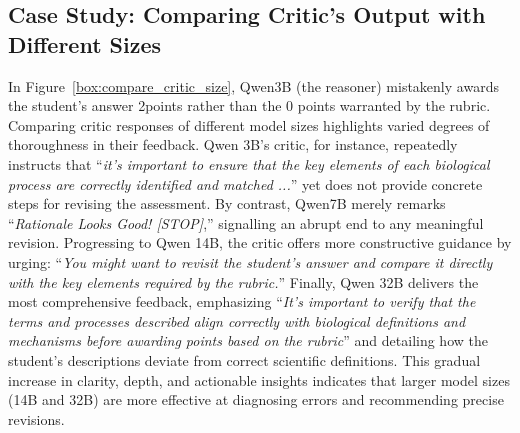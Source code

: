 \subsection{Case Study: Comparing Critic's Output with Different Sizes} \label{sec:compare_critic_sizes}
In Figure~\ref{box:compare_critic_size}, Qwen3B (the reasoner) mistakenly awards the student’s answer 2points rather than the 0 points warranted by the rubric. Comparing critic responses of different model sizes highlights varied degrees of thoroughness in their feedback. Qwen 3B’s critic, for instance, repeatedly instructs that ``\emph{it's important to ensure that the key elements of each biological process are correctly identified and matched ...}'' yet does not provide concrete steps for revising the assessment. By contrast, Qwen7B merely remarks ``\emph{Rationale Looks Good! [STOP]},'' signalling an abrupt end to any meaningful revision. Progressing to Qwen 14B, the critic offers more constructive guidance by urging: ``\emph{You might want to revisit the student’s answer and compare it directly with the key elements required by the rubric.}'' Finally, Qwen 32B delivers the most comprehensive feedback, emphasizing ``\emph{It’s important to verify that the terms and processes described align correctly with biological definitions and mechanisms before awarding points based on the rubric}'' and detailing how the student's descriptions deviate from correct scientific definitions. This gradual increase in clarity, depth, and actionable insights indicates that larger model sizes (14B and 32B) are more effective at diagnosing errors and recommending precise revisions.

